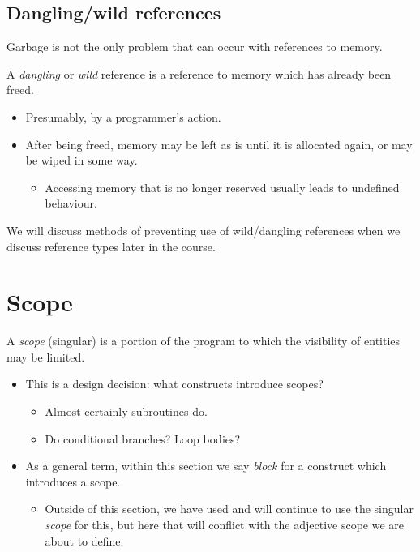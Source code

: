 \documentclass[11pt]{article}
\theoremstyle{definition}
\begin{document}
\subsection{Dangling/wild references}
\label{sec:orga17d3ef}

Garbage is not the only problem that can occur with
references to memory.

A \emph{dangling} or \emph{wild} reference is a reference to memory
which has already been freed.
\begin{itemize}
\item Presumably, by a programmer's action.
\item After being freed, memory may be left as is until it
is allocated again, or may be wiped in some way.
\begin{itemize}
\item Accessing memory that is no longer reserved
usually leads to undefined behaviour.
\end{itemize}
\end{itemize}

We will discuss methods of preventing use of wild/dangling references
when we discuss reference types later in the course.

\section{Scope}
\label{sec:org9c67daf}

A \emph{scope} (singular) is a portion of the program to which the visibility
of entities may be limited.
\begin{itemize}
\item This is a design decision: what constructs introduce scopes?
\begin{itemize}
\item Almost certainly subroutines do.
\item Do conditional branches? Loop bodies?
\end{itemize}
\item As a general term, within this section we say \emph{block} for a construct which
introduces a scope.
\begin{itemize}
\item Outside of this section, we have used and will continue to use the
singular \emph{scope} for this, but here that will conflict with
the adjective scope we are about to define.
\end{itemize}
\end{itemize}
\end{document}
